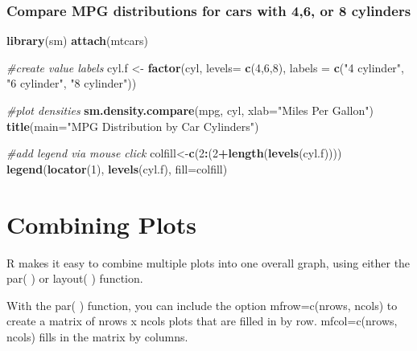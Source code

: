 \documentclass[]{book}
\newenvironment{Shaded}{\begin{snugshade}}{\end{snugshade}}
\newcommand{\KeywordTok}[1]{\textcolor[rgb]{0.13,0.29,0.53}{\textbf{#1}}}
\newcommand{\DataTypeTok}[1]{\textcolor[rgb]{0.13,0.29,0.53}{#1}}
\newcommand{\DecValTok}[1]{\textcolor[rgb]{0.00,0.00,0.81}{#1}}
\newcommand{\StringTok}[1]{\textcolor[rgb]{0.31,0.60,0.02}{#1}}
\newcommand{\CommentTok}[1]{\textcolor[rgb]{0.56,0.35,0.01}{\textit{#1}}}
\newcommand{\OperatorTok}[1]{\textcolor[rgb]{0.81,0.36,0.00}{\textbf{#1}}}
\newcommand{\NormalTok}[1]{#1}
\theoremstyle{definition}
\theoremstyle{definition}
\theoremstyle{definition}
\theoremstyle{remark}
\begin{document}
\subsubsection{Compare MPG distributions for cars with 4,6, or 8
cylinders}\label{compare-mpg-distributions-for-cars-with-46-or-8-cylinders}

\begin{Shaded}
\begin{Highlighting}[]
\KeywordTok{library}\NormalTok{(sm)}
\KeywordTok{attach}\NormalTok{(mtcars)}

\CommentTok{#create value labels }
\NormalTok{cyl.f <-}\StringTok{ }\KeywordTok{factor}\NormalTok{(cyl, }\DataTypeTok{levels=} \KeywordTok{c}\NormalTok{(}\DecValTok{4}\NormalTok{,}\DecValTok{6}\NormalTok{,}\DecValTok{8}\NormalTok{),}
  \DataTypeTok{labels =} \KeywordTok{c}\NormalTok{(}\StringTok{"4 cylinder"}\NormalTok{, }\StringTok{"6 cylinder"}\NormalTok{, }\StringTok{"8 cylinder"}\NormalTok{)) }

\CommentTok{#plot densities }
\KeywordTok{sm.density.compare}\NormalTok{(mpg, cyl, }\DataTypeTok{xlab=}\StringTok{"Miles Per Gallon"}\NormalTok{)}
\KeywordTok{title}\NormalTok{(}\DataTypeTok{main=}\StringTok{"MPG Distribution by Car Cylinders"}\NormalTok{)}

\CommentTok{#add legend via mouse click}
\NormalTok{colfill<-}\KeywordTok{c}\NormalTok{(}\DecValTok{2}\OperatorTok{:}\NormalTok{(}\DecValTok{2}\OperatorTok{+}\KeywordTok{length}\NormalTok{(}\KeywordTok{levels}\NormalTok{(cyl.f)))) }
\KeywordTok{legend}\NormalTok{(}\KeywordTok{locator}\NormalTok{(}\DecValTok{1}\NormalTok{), }\KeywordTok{levels}\NormalTok{(cyl.f), }\DataTypeTok{fill=}\NormalTok{colfill)}
\end{Highlighting}
\end{Shaded}

\section{Combining Plots}\label{combining-plots}

R makes it easy to combine multiple plots into one overall graph, using
either the par( ) or layout( ) function.

With the par( ) function, you can include the option mfrow=c(nrows,
ncols) to create a matrix of nrows x ncols plots that are filled in by
row. mfcol=c(nrows, ncols) fills in the matrix by columns.

\begin{Shaded}
\end{Shaded}
\end{document}
